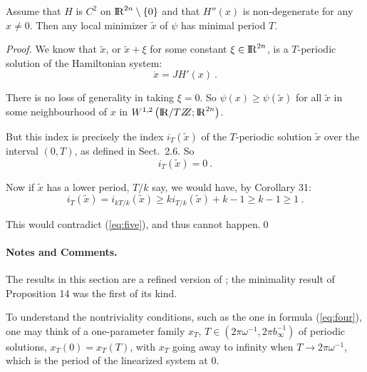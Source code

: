 \documentclass{svproc}
\begin{document}
\begin{lemma}
Assume that $H$ is $C^{2}$ on ${\rm I\!R}^{2n} \setminus \{ 0\}$ and
that $H'' (x)$ is non-de\-gen\-er\-ate for any $x\ne 0$. Then any local
minimizer $\widetilde{x}$ of $\psi$ has minimal period $T$.
\end{lemma}
%
\begin{proof}
We know that $\widetilde{x}$, or
$\widetilde{x} + \xi$ for some constant $\xi
\in {\rm I\!R}^{2n}$, is a $T$-periodic solution of the Hamiltonian system:
\begin{equation}
  \dot{x} = JH' (x)\ .
\end{equation}

There is no loss of generality in taking $\xi = 0$. So
$\psi (x) \ge \psi (\widetilde{x} )$
for all $\widetilde{x}$ in some neighbourhood of $x$ in
$W^{1,2} \left(\bbbr / T\bbbz ; \bbbr^{2n}\right)$.

But this index is precisely the index
$i_{T} (\widetilde{x} )$ of the $T$-periodic
solution $\widetilde{x}$ over the interval
$(0,T)$, as defined in Sect.~2.6. So
\begin{equation}
  i_{T} (\widetilde{x} ) = 0\ .
  \label{eq:five}
\end{equation}

Now if $\widetilde{x}$ has a lower period, $T/k$ say,
we would have, by Corollary 31:
\begin{equation}
  i_{T} (\widetilde{x} ) =
  i_{kT/k}(\widetilde{x} ) \ge
  ki_{T/k} (\widetilde{x} ) + k-1 \ge k-1 \ge 1\ .
\end{equation}

This would contradict (\ref{eq:five}), and thus cannot happen.\qed
\end{proof}
%
\paragraph{Notes and Comments.}
The results in this section are a
refined version of \cite{smit:wat};
the minimality result of Proposition
14 was the first of its kind.

To understand the nontriviality conditions, such as the one in formula
(\ref{eq:four}), one may think of a one-parameter family
$x_{T}$, $T\in \left(2\pi\omega^{-1}, 2\pi b_{\infty}^{-1}\right)$
of periodic solutions, $x_{T} (0) = x_{T} (T)$,
with $x_{T}$ going away to infinity when $T\to 2\pi \omega^{-1}$,
which is the period of the linearized system at 0.
\end{document}
